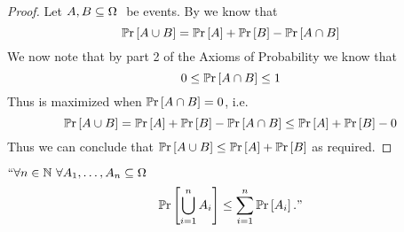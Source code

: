         \begin{proof}
            Let $A, B \subseteq \Omega \ $ be events. By 
            we know that 
            \begin{equation}
                \mathbb{P}\mathrm{r} \left[A \cup B\right] = \mathbb{P}\mathrm{r} \left[A\right] + \mathbb{P}\mathrm{r} \left[B\right] - \mathbb{P}\mathrm{r} \left[A \cap B\right]
                \label{Union Bound Corollary 1}
            \end{equation}
            We now note that by part 2 of the Axioms of Probability we know that
            \[
                0 \le \mathbb{P}\mathrm{r} \left[A \cap B\right] \le 1
            \]
            Thus  is maximized when $\mathbb{P}\mathrm{r} \left[A \cap B\right] = 0$, i.e.
            \[
                \mathbb{P}\mathrm{r} \left[A \cup B\right] = \mathbb{P}\mathrm{r} \left[A\right] + \mathbb{P}\mathrm{r} \left[B\right] - \mathbb{P}\mathrm{r} \left[A \cap B\right] \le \mathbb{P}\mathrm{r} \left[A\right] + \mathbb{P}\mathrm{r} \left[B\right] - 0
            \]
            Thus we can conclude that $\mathbb{P}\mathrm{r} \left[A \cup B\right] \le \mathbb{P}\mathrm{r} \left[A\right] + \mathbb{P}\mathrm{r} \left[B\right]$ as required. \QED
        \end{proof}
        \begin{theorem}
            \label{Union Bound}
            $``\forall n \in \mathbb{N} \ \forall A_1, \dots, A_n \subseteq \Omega \ $
            \[
                \mathbb{P}\mathrm{r} \left[\displaystyle\bigcup_{i = 1}^{n} A_i\right] \le \sum_{i = 1}^{n} \mathbb{P}\mathrm{r} \left[A_i\right]."
            \]
        \end{theorem}
